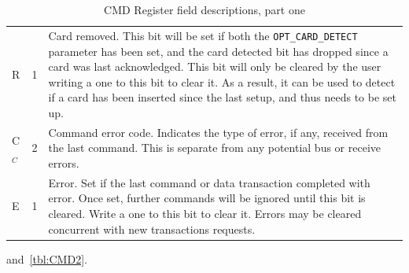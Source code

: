 \documentclass{gqtekspec}
\begin{document}
\begin{table}
\begin{center}
\begin{tabular}{|p{1.2in}|p{0.5in}|p{4.0in}|}
R & 1 & Card removed.  This bit will be set if both the {\tt OPT\_CARD\_DETECT}
	parameter has been set, and the card detected bit has dropped since
	a card was last acknowledged.  This bit will only be cleared by the user
	writing a one to this bit to clear it.   As a result, it can be
	used to detect if a card has been inserted since the last setup, and
	thus needs to be set up. \\
C$_C$&2& Command error code.  Indicates the type of error, if any, received
	from the last command.  This is separate from any potential bus or
	receive errors. \\
E & 1 & Error.  Set if the last command or data transaction completed with
	error.  Once set, further commands will be ignored until this bit is
	cleared.  Write a one to this bit to clear it.  Errors may be cleared
	concurrent with new transactions requests. \\\hline
\end{tabular}
\caption{CMD Register field descriptions, part one}\label{tbl:CMD1}
\end{center}\end{table}
and~\ref{tbl:CMD2}.
\end{document}
